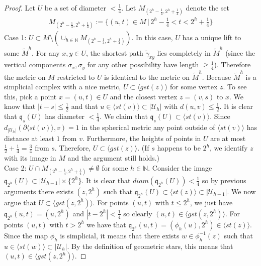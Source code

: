 \documentclass[a4paper,11pt]{article}
\theoremstyle{definition}
\theoremstyle{plain}
\theoremstyle{remark}
\begin{document}
{\begin{proof} Let $U$ be a set of diameter $<\frac{1}{4}$. Let $M_{(2^h-\frac{1}{4}, 2^h+\frac{1}{4})}$ denote the set
\begin{align*}
M_{(2^h-\frac{1}{4}, 2^h+\frac{1}{4})} := \{(u,t)\in M \,|\, 2^h-\frac{1}{4} < t < 2^h + \frac{1}{4} \}
\end{align*}
Case 1: $U\subset M\setminus (\cup_{h\in \mathbb{N}} M_{(2^h-\frac{1}{4}, 2^h+\frac{1}{4})})$. In this case, $U$ has a unique lift to some $\tilde{M}^{h}$. For any $x,y\in U$, the shortest path $\tilde{\gamma}_{xy}$ lies completely in $\tilde{M}^{h}$ (since the vertical components $\sigma_x,\sigma_y$ for any other possibility have length $\geq\frac{1}{4}$). Therefore the metric on $M$ restricted to $U$ is identical to the metric on $\tilde{M}^{h}$. Because $\tilde{M}^{h}$ is a simplicial complex with a nice metric, $U\subset \langle gst(z) \rangle$ for some vertex $z$. To see this, pick a point $x=(u,t) \in U$ and the closest vertex $z=(v,s)$ to $x$. We know that $|t-s|\leq\frac{1}{2}$ and that $u\in \langle st(v)\rangle \subset |\mathcal{U}_{h}|$ with $d(u,v)\leq \frac{1}{2}$. It is clear that $\mathfrak{q}_{s}(U)$ has diameter $<\frac{1}{4}$. We claim that $\mathfrak{q}_{s}(U)  \subset \langle st(v)\rangle$. Since $d_{|\mathcal{U}_{h}|}(\partial \langle st(v)\rangle, v) = 1$ in the spherical metric any point outside of $\langle st(v) \rangle$ has distance at least $1$ from $v$. Furthermore, the heights of points in $U$ are at most $\frac{1}{2}+\frac{1}{4}=\frac{3}{4}$ from $s$. Therefore, $U\subset \langle gst(z)\rangle$. (If $s$ happens to be $2^h$, we identify $z$ with its image in $M$ and the argument still holds.) \\

Case 2: $U\cap M_{(2^h-\frac{1}{4}, 2^h+\frac{1}{4})}\neq \emptyset$ for some $h\in \mathbb{N}$. Consider the image $\mathfrak{q}_{2^h}(U)\subset |\mathcal{U}_{h-1}| \times \{2^h\}$. It is clear that $diam(\mathfrak{q}_{2^h}(U))<\frac{1}{4}$ so by previous arguments there exists $(z,2^h)$ such that $\mathfrak{q}_{2^h}(U)\subset \langle st(z) \rangle \subset |\mathcal{U}_{h-1}|$. We now argue that $U\subset \langle gst(z,2^h)\rangle$. For points $(u,t)$ with $t\leq 2^h$, we just have $\mathfrak{q}_{2^h}(u,t) = (u,2^h)$ and $|t-2^h|<\frac{1}{4}$ so clearly $(u,t)\in \langle gst(z,2^h)\rangle$. For points $(u,t)$ with $t>2^h$ we have that $\mathfrak{q}_{2^h}(u,t) = (\phi_{h}(u),2^h)\in \langle st(z)\rangle$. Since the map $\phi_{h}$ is simplicial, it means that there exists $w\in \phi_{h}^{-1}(z)$ such that $u\in \langle st(w) \rangle\subset |\mathcal{U}_{h}|$. By the definition of geometric stars, this means that $(u,t)\in \langle gst(z,2^h) \rangle $.
\end{proof}



}
\end{document}
